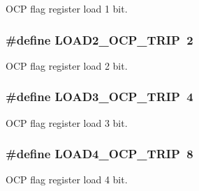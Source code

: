 O\-C\-P flag register load 1 bit. \hypertarget{a00030_af45ed9a707fb208c436f4f9cfd0adfec}{
\subsubsection[{L\-O\-A\-D2\-\_\-\-O\-C\-P\-\_\-\-T\-R\-I\-P}]{\setlength{\rightskip}{0pt plus 5cm}\#define L\-O\-A\-D2\-\_\-\-O\-C\-P\-\_\-\-T\-R\-I\-P~2}}\label{a00030_af45ed9a707fb208c436f4f9cfd0adfec}
O\-C\-P flag register load 2 bit. \hypertarget{a00030_a94b1ce836bab1ddbaf5a153cf84f42b7}{
\subsubsection[{L\-O\-A\-D3\-\_\-\-O\-C\-P\-\_\-\-T\-R\-I\-P}]{\setlength{\rightskip}{0pt plus 5cm}\#define L\-O\-A\-D3\-\_\-\-O\-C\-P\-\_\-\-T\-R\-I\-P~4}}\label{a00030_a94b1ce836bab1ddbaf5a153cf84f42b7}
O\-C\-P flag register load 3 bit. \hypertarget{a00030_a271333484c12cc2d424b2870bbd2ea77}{
\subsubsection[{L\-O\-A\-D4\-\_\-\-O\-C\-P\-\_\-\-T\-R\-I\-P}]{\setlength{\rightskip}{0pt plus 5cm}\#define L\-O\-A\-D4\-\_\-\-O\-C\-P\-\_\-\-T\-R\-I\-P~8}}\label{a00030_a271333484c12cc2d424b2870bbd2ea77}
O\-C\-P flag register load 4 bit. 

